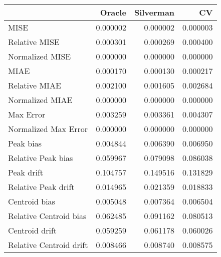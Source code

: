 \begin{tabular}{lrrr}
  \hline
 & Oracle & Silverman & CV \\ 
  \hline
MISE & 0.000002 & 0.000002 & 0.000003 \\ 
  Relative MISE & 0.000301 & 0.000269 & 0.000400 \\ 
  Normalized MISE & 0.000000 & 0.000000 & 0.000000 \\ 
  MIAE & 0.000170 & 0.000130 & 0.000217 \\ 
  Relative MIAE & 0.002100 & 0.001605 & 0.002684 \\ 
  Normalized MIAE & 0.000000 & 0.000000 & 0.000000 \\ 
  Max Error & 0.003259 & 0.003361 & 0.004307 \\ 
  Normalized Max Error & 0.000000 & 0.000000 & 0.000000 \\ 
  Peak bias & 0.004844 & 0.006390 & 0.006950 \\ 
  Relative Peak bias & 0.059967 & 0.079098 & 0.086038 \\ 
  Peak drift & 0.104757 & 0.149516 & 0.131829 \\ 
  Relative Peak drift & 0.014965 & 0.021359 & 0.018833 \\ 
  Centroid bias & 0.005048 & 0.007364 & 0.006504 \\ 
  Relative Centroid bias & 0.062485 & 0.091162 & 0.080513 \\ 
  Centroid drift & 0.059259 & 0.061178 & 0.060026 \\ 
  Relative Centroid drift & 0.008466 & 0.008740 & 0.008575 \\ 
   \hline
\end{tabular}
